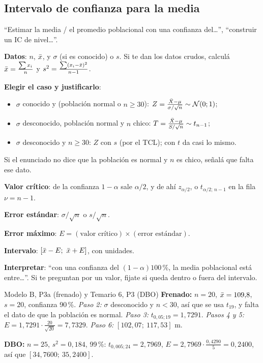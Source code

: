\subsection{Intervalo de confianza para la media}\label{p:icmu}
\begin{cuando}
``Estimar la media / el promedio poblacional con una confianza del\ldots'', ``construir un IC de nivel\ldots''.
\end{cuando}
\begin{pasos}
\begin{pasolista}
\item \textbf{Datos}: $n$, $\bar{x}$, y $\sigma$ (si es conocido) o $s$. Si te dan los datos crudos, calculá $\bar{x}=\frac{\sum x_i}{n}$ y $s^2=\frac{\sum(x_i-\bar{x})^2}{n-1}$.
\item \textbf{Elegir el caso y justificarlo}:
\begin{itemize}
\item $\sigma$ conocido y (población normal o $n\ge30$): $Z=\frac{\bar{X}-\mu}{\sigma/\sqrt n}\sim\mathcal{N}(0;1)$;
\item $\sigma$ desconocido, población normal y $n$ chico: $T=\frac{\bar{X}-\mu}{S/\sqrt n}\sim t_{n-1}$;
\item $\sigma$ desconocido y $n\ge30$: $Z$ con $s$ (por el TCL); con $t$ da casi lo mismo.
\end{itemize}
Si el enunciado no dice que la población es normal y $n$ es chico, señalá que falta ese dato.
\item \textbf{Valor crítico}: de la confianza $1-\alpha$ sale $\alpha/2$, y de ahí $z_{\alpha/2}$, o $t_{\alpha/2;\,n-1}$ en la fila $\nu=n-1$.
\item \textbf{Error estándar}: $\sigma/\sqrt n$ o $s/\sqrt n$.
\item \textbf{Error máximo}: $E=(\text{valor crítico})\times(\text{error estándar})$.
\item \textbf{Intervalo}: $[\xb-E;\ \xb+E]$, con unidades.
\item \textbf{Interpretar}: ``con una confianza del $(1-\alpha)100\,\%$, la media poblacional está entre\ldots''. Si te preguntan por un valor, fijate si queda dentro o fuera del intervalo.
\end{pasolista}
\end{pasos}
\begin{modelo}{Modelo B, P3a (frenado) y Temario 6, P3 (DBO)}
\textbf{Frenado:} $n=20$, $\bar{x}=109{,}8$, $s=20$, confianza 90\,\%. \emph{Paso 2:} $\sigma$ desconocido y $n<30$, así que se usa $t_{19}$, y falta el dato de que la población es normal.
\emph{Paso 3:} $t_{0,05;19}=1{,}7291$. \emph{Pasos 4 y 5:} $E=1{,}7291\cdot\frac{20}{\sqrt{20}}=7{,}7329$. \emph{Paso 6:} $[102{,}07;\ 117{,}53]$ m.

\textbf{DBO:} $n=25$, $s^2=0{,}184$, 99\,\%: $t_{0,005;24}=2{,}7969$, $E=2{,}7969\cdot\frac{0{,}4290}{5}=0{,}2400$, así que $[34{,}7600;\ 35{,}2400]$.
\end{modelo}
